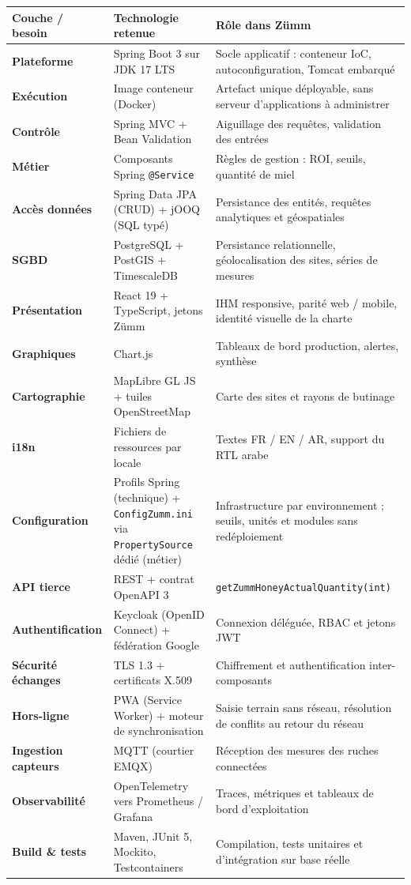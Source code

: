 \begin{xltabular}{\textwidth}{>{\bfseries}p{3.1cm} p{4.9cm} X}
\toprule
\textbf{Couche / besoin} & \textbf{Technologie retenue} & \textbf{Rôle dans Zümm} \\
\midrule
\endhead
Plateforme        & Spring Boot 3 sur JDK 17 LTS      & Socle applicatif : conteneur IoC, autoconfiguration, Tomcat embarqué \\
Exécution         & Image conteneur (Docker)          & Artefact unique déployable, sans serveur d'applications à administrer \\
Contrôle          & Spring MVC + Bean Validation      & Aiguillage des requêtes, validation des entrées \\
Métier            & Composants Spring \texttt{@Service} & Règles de gestion : ROI, seuils, quantité de miel \\
Accès données     & Spring Data JPA (CRUD) + jOOQ (SQL typé) & Persistance des entités, requêtes analytiques et géospatiales \\
SGBD              & PostgreSQL + PostGIS + TimescaleDB & Persistance relationnelle, géolocalisation des sites, séries de mesures \\
Présentation      & React 19 + TypeScript, jetons Zümm & IHM responsive, parité web / mobile, identité visuelle de la charte \\
Graphiques        & Chart.js                          & Tableaux de bord production, alertes, synthèse \\
Cartographie      & MapLibre GL JS + tuiles OpenStreetMap & Carte des sites et rayons de butinage \\
i18n              & Fichiers de ressources par locale & Textes FR / EN / AR, support du RTL arabe \\
Configuration     & Profils Spring (technique) + \texttt{ConfigZumm.ini} via \texttt{PropertySource} dédié (métier) & Infrastructure par environnement ; seuils, unités et modules sans redéploiement \\
API tierce        & REST + contrat OpenAPI 3          & \texttt{getZummHoneyActualQuantity(int)} \\
Authentification  & Keycloak (OpenID Connect) + fédération Google & Connexion déléguée, RBAC et jetons JWT \\
Sécurité échanges & TLS 1.3 + certificats X.509       & Chiffrement et authentification inter-composants \\
Hors-ligne        & PWA (Service Worker) + moteur de synchronisation & Saisie terrain sans réseau, résolution de conflits au retour du réseau \\
Ingestion capteurs & MQTT (courtier EMQX)             & Réception des mesures des ruches connectées \\
Observabilité     & OpenTelemetry vers Prometheus / Grafana & Traces, métriques et tableaux de bord d'exploitation \\
Build \& tests    & Maven, JUnit 5, Mockito, Testcontainers & Compilation, tests unitaires et d'intégration sur base réelle \\
\bottomrule
\end{xltabular}

